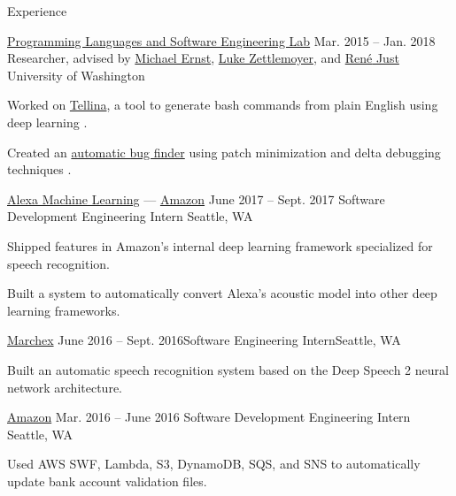 \documentclass{resume}
\begin{document}
\begin{rSection}{Experience}
  \begin{rSubsection}{\href{https://uwplse.org/}
                           {Programming Languages and Software Engineering Lab}}
                     {Mar. 2015 -- Jan. 2018}
                     {Researcher, advised by
                       \href{https://homes.cs.washington.edu/~mernst/}
                            {Michael Ernst},
                       \href{https://www.cs.washington.edu/people/faculty/lsz}
                            {Luke Zettlemoyer},
                       and \href{https://people.cs.umass.edu/~rjust/}
                                {Ren{\'e} Just}}
                     {University of Washington}
  \item Worked on \href{https://github.com/TellinaTool}{Tellina}, a tool
    to generate bash commands from plain English using deep learning \citep{LinWPVZE2017:TR}.
  \item Created an \href{https://github.com/pderichai/patch-minimization}
                        {automatic bug finder}
    using patch minimization and delta debugging techniques
    \citep{Pearson:2017:EIF:3097368.3097441}.
  \end{rSubsection}
  
  \begin{rSubsection}{\href{https://www.amazon.jobs/en/teams/alexa-ai/}
                           {Alexa Machine Learning} ---
                       {\href{https://www.amazon.com/}{Amazon}}}
                     {June 2017 -- Sept. 2017}
                     {Software Development Engineering Intern}
                     {Seattle, WA}
    \item Shipped features in Amazon's internal deep learning framework
      specialized for speech recognition.
    \item Built a system to automatically convert Alexa's acoustic model into
      other deep learning frameworks.
  \end{rSubsection}

  \begin{rSubsection}{\href{http://www.marchex.com/}{Marchex}}
    {June 2016 -- Sept. 2016}{Software Engineering Intern}{Seattle, WA}
  \item Built an automatic speech recognition system based on the Deep Speech 2
    neural network architecture.
  \end{rSubsection}

  \begin{rSubsection}{\href{https://www.amazon.com/}{Amazon}}
                     {Mar. 2016 -- June 2016}
                     {Software Development Engineering Intern}
                     {Seattle, WA}
  \item Used AWS SWF, Lambda, S3, DynamoDB, SQS, and SNS to automatically update
    bank account validation files.
  \end{rSubsection}

\end{rSection}
\end{document}
